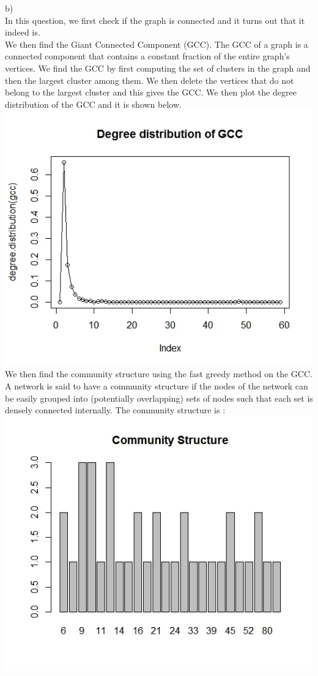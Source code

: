 \documentclass{article}
\begin{document}
b)\\
In this question, we first check if the graph is connected and it turns out that it indeed is.\\
We then find the Giant Connected Component (GCC). The GCC of a graph is a connected component that 
contains a constant fraction of the entire graph's vertices.
We find the GCC by first computing the set of clusters in the graph
and then the largest cluster among them. We then delete the vertices that do not belong to the largest cluster and this gives
the GCC. We then plot the degree distribution of the GCC and it is shown below.\\
\includegraphics[scale=0.4]{pb3} \\

We then find the community structure using the fast greedy method on the GCC. 
A network is said to have a community structure if the nodes of the network 
can be easily grouped into (potentially overlapping) sets of nodes such that each set is densely connected internally. 
The community structure is :\\
\includegraphics[scale=0.4]{pb4} \\
\end{document}
